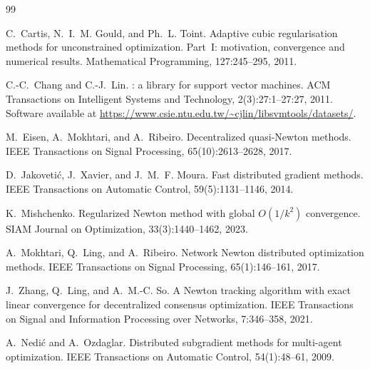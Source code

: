 \documentclass[review,onefignum,onetabnum]{siamart171218}
\begin{document}

	\begin{thebibliography}{99}
		
		C.~Cartis, N.~I.~M. Gould, and Ph.~L. Toint.
		\newblock Adaptive cubic regularisation methods for unconstrained optimization. Part~I: motivation, convergence and numerical results.
		\newblock Mathematical Programming, 127:245--295, 2011.
		
		C.-C.~Chang and C.-J.~Lin.
		: a library for support vector machines.
		\newblock ACM Transactions on Intelligent Systems and Technology, 2(3):27:1--27:27, 2011.
		\newblock Software available at \url{https://www.csie.ntu.edu.tw/~cjlin/libsvmtools/datasets/}.
		
		M.~Eisen, A.~Mokhtari, and A.~Ribeiro.
		\newblock Decentralized quasi-{N}ewton methods.
		\newblock IEEE Transactions on Signal Processing, 65(10):2613--2628, 2017.
		
		D.~Jakoveti{\'c}, J.~Xavier, and J.~M.~F. Moura.
		\newblock Fast distributed gradient methods.
		\newblock IEEE Transactions on Automatic Control, 59(5):1131--1146, 2014.
		
		K.~Mishchenko.
		\newblock Regularized {N}ewton method with global $O(1/k^2)$ convergence.
		\newblock SIAM Journal on Optimization, 33(3):1440--1462, 2023.
		
		A.~Mokhtari, Q.~Ling, and A.~Ribeiro.
		\newblock Network {N}ewton distributed optimization methods.
		\newblock IEEE Transactions on Signal Processing, 65(1):146--161, 2017.
		
		J.~Zhang, Q.~Ling, and A.~M.-C. So.
		\newblock A {N}ewton tracking algorithm with exact linear convergence for decentralized consensus optimization.
		\newblock IEEE Transactions on Signal and Information Processing over Networks, 7:346--358, 2021.
		
		A.~Nedi{\'c} and A.~Ozdaglar.
		\newblock Distributed subgradient methods for multi-agent optimization.
		\newblock IEEE Transactions on Automatic Control, 54(1):48--61, 2009.
		

\end{thebibliography}
\end{document}
